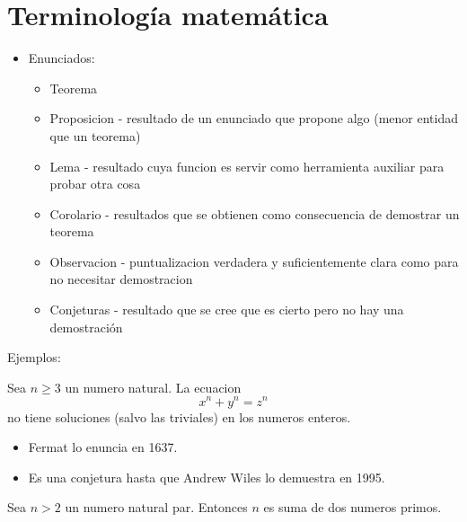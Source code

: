 


\section*{Terminología matemática}

\begin{itemize}
	\item Enunciados:
	      \begin{itemize}
		      \item Teorema
		      \item Proposicion - resultado de un enunciado que propone algo (menor entidad que un teorema)
		      \item Lema - resultado cuya funcion es servir como herramienta auxiliar para probar otra cosa
		      \item Corolario - resultados que se obtienen como consecuencia de demostrar un teorema
		      \item Observacion - puntualizacion verdadera y suficientemente clara como para no necesitar demostracion
		      \item Conjeturas - resultado que se cree que es cierto pero no hay una demostración
	      \end{itemize}
\end{itemize}


Ejemplos:
\begin{theorem}
	Sea \(n \geq  3 \) un numero natural. La ecuacion
	\[
		x^{n } + y^{n} = z^{n}
	\]
	no tiene soluciones (salvo las triviales) en los numeros enteros.
\end{theorem}
\begin{itemize}
	\item Fermat lo enuncia en 1637.
	\item Es una conjetura hasta que Andrew Wiles lo demuestra en 1995.
\end{itemize}
\begin{conjetura}[de Goldbach]
	Sea \(n>2 \) un numero natural par. Entonces \(n \) es suma de dos numeros primos.
\end{conjetura}

